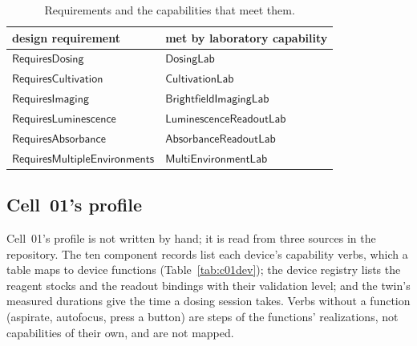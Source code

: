 \documentclass[10pt,a4paper]{article}
\begin{document}
\begin{table}[tbp]\centering\footnotesize
\caption{Requirements and the capabilities that meet them.}\label{tab:reqcap}
\begin{tabularx}{\linewidth}{@{}XX@{}}\toprule design requirement & met by laboratory capability \\ \midrule
$\mathsf{RequiresDosing}$ & $\mathsf{DosingLab}$ \\
$\mathsf{RequiresCultivation}$ & $\mathsf{CultivationLab}$ \\
$\mathsf{RequiresImaging}$ & $\mathsf{BrightfieldImagingLab}$ \\
$\mathsf{RequiresLuminescence}$ & $\mathsf{LuminescenceReadoutLab}$ \\
$\mathsf{RequiresAbsorbance}$ & $\mathsf{AbsorbanceReadoutLab}$ \\
$\mathsf{RequiresMultipleEnvironments}$ & $\mathsf{MultiEnvironmentLab}$ \\
\bottomrule\end{tabularx}\end{table}


\subsection{Cell~01's profile}
Cell~01's profile is not written by hand; it is read from three sources in the repository. The ten component records
list each device's capability verbs, which a table maps to device functions (Table~\ref{tab:c01dev}); the device
registry lists the reagent stocks and the readout bindings with their validation level; and the twin's measured
durations give the time a dosing session takes. Verbs without a function (aspirate, autofocus, press a button) are
steps of the functions' realizations, not capabilities of their own, and are not mapped.
\end{document}
